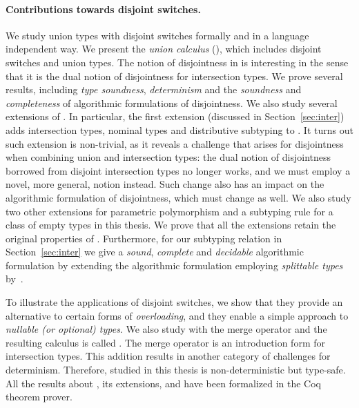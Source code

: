 \paragraph{Contributions towards disjoint switches.}
We study union types with disjoint switches formally
and in a language independent way. We present the \emph{union
  calculus} (\name), which includes disjoint switches and union types.
The notion of disjointness in \name is interesting in the sense that it is
the dual notion of disjointness for intersection types.
We prove several results, including \emph{type soundness}, \emph{determinism}
and the \emph{soundness} and \emph{completeness} of algorithmic formulations
of disjointness.
We also study several extensions of \name. In particular,
the first extension (discussed in Section~\ref{sec:inter}) adds intersection
types, nominal types and distributive subtyping to \name.
It turns out such extension is non-trivial, as it reveals
a challenge that arises for disjointness when combining
union and intersection types:
the dual notion of disjointness borrowed from
disjoint intersection types no longer works, and we must employ
a novel, more general, notion instead. Such change also has an impact
on the algorithmic formulation of disjointness, which must change as
well. We also study two other extensions for
parametric polymorphism and a subtyping rule for a class of empty types in this thesis.
We prove that all the extensions retain the original properties of \name. Furthermore,
for our subtyping relation in Section~\ref{sec:inter} we give a \emph{sound}, \emph{complete} and
\emph{decidable} algorithmic formulation by extending the algorithmic formulation employing
\emph{splittable types} by~\cite{huang2021distributing}.

To illustrate the applications of disjoint switches,
we show that they provide an alternative to
certain forms of \emph{overloading}, and they enable a simple approach to
\emph{nullable (or optional) types}.
We also study \name with the merge operator 
\citep{oliveira2016disjoint,dunfield2014elaborating,reynolds1988preliminary}
and the resulting calculus is called \namems.
The merge operator is an introduction form for intersection types.
This addition results in another category of challenges
for determinism. Therefore, \namems studied in this thesis
is non-deterministic but type-safe.
All the results about \name, its
extensions, and \namems have been formalized in the Coq theorem prover.

